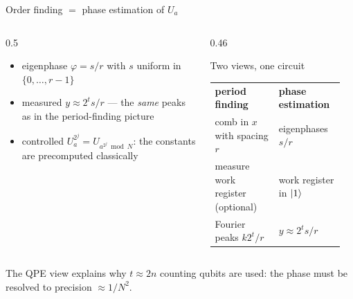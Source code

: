 \documentclass[aspectratio=169,11pt]{beamer}
\begin{document}
\begin{frame}[label=fQPEOrder]{Order finding $=$ phase estimation of $U_a$}
  \small
  \begin{columns}[T]
    \begin{column}{0.5\textwidth}
      \begin{itemize}\itemsep2pt
        \item eigenphase $\varphi = s/r$ with $s$ uniform in $\{0, \dots, r - 1\}$
        \item measured $y \approx 2^t s/r$ --- the \emph{same} peaks as in the period-finding picture
        \item controlled $U_a^{2^j} = U_{a^{2^j} \bmod N}$: the constants are precomputed classically
      \end{itemize}
    \end{column}
    \begin{column}{0.46\textwidth}
      \begin{block}{Two views, one circuit}
        \scriptsize
        \begin{tabular}{@{}p{0.45\linewidth}p{0.45\linewidth}@{}}
          \textbf{period finding} & \textbf{phase estimation}\\
          comb in $x$ with spacing $r$ & eigenphases $s/r$\\
          measure work register (optional) & work register in $\ket1$\\
          Fourier peaks $k2^t/r$ & $y \approx 2^ts/r$
        \end{tabular}
      \end{block}
    \end{column}
  \end{columns}
  \vspace{2pt}
  \centering The QPE view explains why $t \approx 2n$ counting qubits are used: the phase must be resolved to precision $\approx 1/N^2$.
\end{frame}

\end{document}
